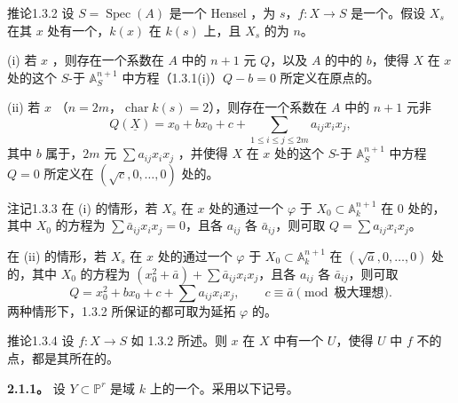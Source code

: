 \begin{SGAresult}{推论}{1.3.2}
设 $S=\operatorname{Spec}(A)$ 是一个 Hensel ，为 $s$，$f:X\to S$ 是一个。假设 $X_s$ 在其 $x$ 处有一个，$k(x)$ 在 $k(s)$ 上，且 $X_s$ 的为 $n$。

(i) 若 $x$ ，则存在一个系数在 $A$ 中的 $n+1$ 元 $Q$，以及 $A$ 的中的 $b$，使得 $X$ 在 $x$ 处的这个 $S$-于 $\mathbb A_S^{n+1}$ 中方程（1.3.1(i)）$Q-b=0$ 所定义在原点的。

(ii) 若 $x$ （$n=2m$，$\operatorname{char}k(s)=2$），则存在一个系数在 $A$ 中的 $n+1$ 元非
\[
 Q(\underline X)=x_0+bx_0+c+\sum_{1\leq i\leq j\leq2m}a_{ij}x_i x_j,\tag{4.14.2}
\]
其中 $b$ 属于，$2m$ 元 $\sum a_{ij}x_i x_j$ ，并使得 $X$ 在 $x$ 处的这个 $S$-于 $\mathbb A_S^{n+1}$ 中方程 $Q=0$ 所定义在 $(\sqrt c,0,\ldots,0)$ 处的。
\end{SGAresult}
\begin{SGAresult}{注记}{1.3.3}
在 (i) 的情形，若 $X_s$ 在 $x$ 处的通过一个 $\varphi$ 于 $X_0\subset\mathbb A_k^{n+1}$ 在 $0$ 处的，其中 $X_0$ 的方程为 $\sum\bar a_{ij}x_i x_j=0$，且各 $a_{ij}$ 各 $\bar a_{ij}$，则可取 $Q=\sum a_{ij}x_i x_j$。

在 (ii) 的情形，若 $X_s$ 在 $x$ 处的通过一个 $\varphi$ 于 $X_0\subset\mathbb A_k^{n+1}$ 在 $(\sqrt{\bar a},0,\ldots,0)$ 处的，其中 $X_0$ 的方程为 $(x_0^2+\bar a)+\sum\bar a_{ij}x_i x_j$，且各 $a_{ij}$ 各 $\bar a_{ij}$，则可取
\[
 Q=x_0^2+bx_0+c+\sum a_{ij}x_i x_j,
 \qquad c\equiv\bar a\pmod{\text{极大理想}}.
\]
两种情形下，1.3.2 所保证的都可取为延拓 $\varphi$ 的。
\end{SGAresult}
\begin{SGAresult}{推论}{1.3.4}
设 $f:X\to S$ 如 1.3.2 所述。则 $x$ 在 $X$ 中有一个 $U$，使得 $U$ 中 $f$ 不的点，都是其所在的。
\end{SGAresult}
\textbf{2.1.1。} 设 $Y\subset\mathbb P^r$ 是域 $k$ 上的一个。采用以下记号。

